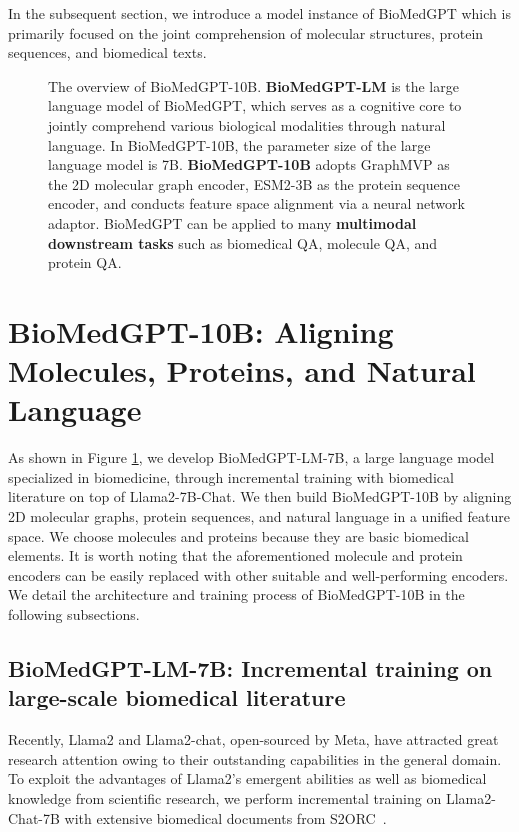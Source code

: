 \documentclass{article}
\begin{document}
In the subsequent section, we introduce a model instance of BioMedGPT which is primarily focused on the joint comprehension of molecular structures, protein sequences, and biomedical texts.


\begin{figure}[htp]
  \centering
{}
  \caption{The overview of BioMedGPT-10B. \textbf{BioMedGPT-LM} is the large language model of BioMedGPT, which serves as a cognitive core to jointly comprehend various biological modalities through natural language. In BioMedGPT-10B, the parameter size of the large language model is 7B. \textbf{BioMedGPT-10B} adopts GraphMVP \citep{GraphMVP} as the 2D molecular graph encoder, ESM2-3B \citep{ESM2} as the protein sequence encoder, and conducts feature space alignment via a neural network adaptor. BioMedGPT can be applied to many \textbf{multimodal downstream tasks} such as biomedical QA, molecule QA, and protein QA.} \label{biomedgpt}
\end{figure}

\section{BioMedGPT-10B: Aligning Molecules, Proteins, and Natural Language}


As shown in Figure \ref{biomedgpt}, we develop BioMedGPT-LM-7B, a large language model specialized in biomedicine, through incremental training with biomedical literature on top of Llama2-7B-Chat. We then build BioMedGPT-10B by aligning 2D molecular graphs, protein sequences, and natural language in a unified feature space. We choose molecules and proteins because they are basic biomedical elements. It is worth noting that the aforementioned molecule and protein encoders can be easily replaced with other suitable and well-performing encoders.
We detail the architecture and training process of BioMedGPT-10B in the following subsections.

\subsection{BioMedGPT-LM-7B: Incremental training on large-scale biomedical literature}

Recently, Llama2 and Llama2-chat, open-sourced by Meta, have attracted great research attention owing to their outstanding capabilities in the general domain. To exploit the advantages of Llama2's emergent abilities as well as biomedical knowledge from scientific research, we perform incremental training on Llama2-Chat-7B with extensive biomedical documents from S2ORC~\citep{lo-wang-2020-s2orc}. 
\end{document}
